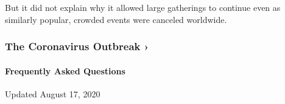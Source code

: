 But it did not explain why it allowed large gatherings to continue even
as similarly popular, crowded events were canceled worldwide.

\href{https://www.nytimes3xbfgragh.onion/news-event/coronavirus?action=click\&pgtype=Article\&state=default\&region=MAIN_CONTENT_3\&context=storylines_faq}{}

\hypertarget{the-coronavirus-outbreak-}{%
\subsubsection{The Coronavirus Outbreak
›}\label{the-coronavirus-outbreak-}}

\hypertarget{frequently-asked-questions}{%
\paragraph{Frequently Asked
Questions}\label{frequently-asked-questions}}

Updated August 17, 2020

